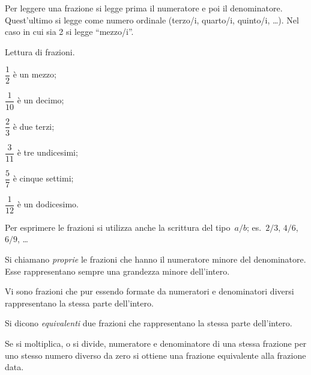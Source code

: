 Per leggere una frazione si legge prima il numeratore e poi il denominatore.
Quest'ultimo si legge come numero ordinale (terzo/i, quarto/i, quinto/i, \ldots).
Nel caso in cui sia 2 si legge ``mezzo/i''.

\begin{exrig}
\begin{esempio}
 Lettura di frazioni.
 \begin{multicols}{3}
 \begin{enumeratea}
\item $\dfrac{1}{2}$ è un mezzo;
\item $\dfrac{1}{10}$ è un decimo;
\item $\dfrac{2}{3}$ è due terzi;
\item $\dfrac{3}{11}$ è tre undicesimi;
\item $\dfrac{5}{7}$ è cinque settimi;
\item $\dfrac{1}{12}$ è un dodicesimo.
\end{enumeratea}
\end{multicols}
\end{esempio}
\end{exrig}

Per esprimere le frazioni si utilizza anche la scrittura del tipo~$a/b$; es.~$2/3$, $4/6$, $6/9$, \ldots

\begin{definizione}
Si chiamano \emph{proprie} le frazioni che hanno il numeratore minore del denominatore.
Esse rappresentano sempre una grandezza minore dell'intero.
\end{definizione}

\pagebreak

Vi sono frazioni che pur essendo formate da numeratori e denominatori diversi rappresentano
la stessa parte dell'intero.
\begin{center}
 
\end{center}
 \ovalbox{\risolvii \ref{ese:3.1}, \ref{ese:3.2}, \ref{ese:3.3}, \ref{ese:3.4}}

\begin{definizione}
Si dicono \emph{equivalenti} due frazioni che rappresentano la stessa parte dell'intero.
\end{definizione}

\begin{proprieta}
Se si moltiplica, o si divide, numeratore e denominatore di una stessa frazione per uno stesso numero diverso da zero
si ottiene una frazione equivalente alla frazione data.
\end{proprieta}

